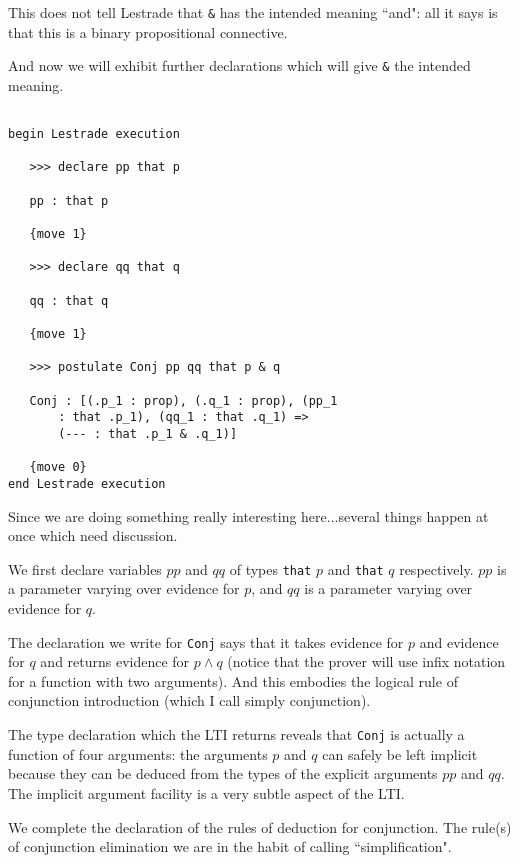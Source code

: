 \documentclass[12pt]{article}
\begin{document}
This does not tell Lestrade that \verb|&| has the intended meaning ``and":  all it says is that this is a binary propositional connective.

And now we will exhibit further declarations which will give \verb|&| the intended meaning.
\newpage
\begin{verbatim}

begin Lestrade execution

   >>> declare pp that p

   pp : that p

   {move 1}

   >>> declare qq that q

   qq : that q

   {move 1}

   >>> postulate Conj pp qq that p & q

   Conj : [(.p_1 : prop), (.q_1 : prop), (pp_1 
       : that .p_1), (qq_1 : that .q_1) => 
       (--- : that .p_1 & .q_1)]

   {move 0}
end Lestrade execution

\end{verbatim}

Since we are doing something really interesting here$\ldots$several things happen at once which need discussion.

We first declare variables $pp$ and $qq$ of types {\tt that} $p$ and {\tt that} $q$ respectively.  $pp$ is a parameter
varying over evidence for $p$, and $qq$ is a parameter varying over evidence for $q$.

The declaration we write for {\tt Conj} says that it takes evidence for $p$ and evidence for $q$ and returns evidence for $p \wedge q$ (notice that the prover will use infix notation for a function with two arguments).  And this embodies the logical rule of conjunction introduction (which I call simply conjunction).

The type declaration which the LTI returns reveals that {\tt Conj} is actually a function of four arguments:  the arguments
$p$ and $q$ can safely be left implicit because they can be deduced from the types of the explicit arguments $pp$ and $qq$.   The implicit argument facility is a very subtle aspect of the LTI.

We complete the declaration of the rules of deduction for conjunction.  The rule(s) of conjunction elimination we are in the habit of calling ``simplification".
\end{document}
